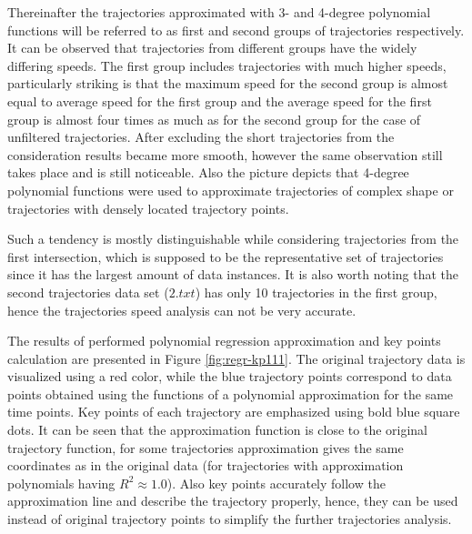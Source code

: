 Thereinafter the trajectories approximated with 3- and 4-degree polynomial functions will be referred to as first and second groups of trajectories respectively. It can be observed that trajectories from different groups have the widely differing speeds. The first group includes trajectories with much higher speeds, particularly striking is that the maximum speed for the second group is almost equal to average speed for the first group and the average speed for the first group is almost four times as much as for the second group for the case of unfiltered trajectories. After excluding the short trajectories from the consideration results became more smooth, however the same observation still takes place and is still noticeable. Also the picture depicts that 4-degree polynomial functions were used to approximate trajectories of complex shape or trajectories with densely located trajectory points. 

Such a tendency is mostly distinguishable while considering trajectories from the first intersection, which is supposed to be the representative set of trajectories since it has the largest amount of data instances. It is also worth noting that the second trajectories data set ($2.txt$) has only 10 trajectories in the first group, hence the trajectories speed analysis can not be very accurate.

The results of performed polynomial regression approximation and key points calculation are presented in Figure \ref{fig:regr-kp111}. The original trajectory data is visualized using a red color, while the blue trajectory points correspond to data points obtained using the functions of a polynomial approximation for the same time points. Key points of each trajectory are emphasized using bold blue square dots. It can be seen that the approximation function is close to the original trajectory function, for some trajectories approximation gives the same coordinates as in the original data (for trajectories with approximation polynomials having $R^2 \approx 1.0$). Also key points accurately follow the approximation line and describe the trajectory properly, hence, they can be used instead of original trajectory points to simplify the further trajectories analysis. 

